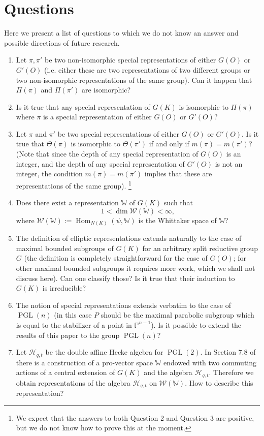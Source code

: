 \documentclass[11pt,a4paper,twoside]{amsart}
\theoremstyle{definition}
\theoremstyle{remark}
\newcommand{\mW}{\mathbb W}
\newcommand{\mcH}{\mathcal H}
\newcommand{\mcW}{\mathcal W}
\newcommand{\Hom}{\operatorname{Hom}}
\newcommand{\PGL}{\operatorname{PGL}}
\begin{document}
\section{Questions}\label{quest}
Here we present a list of questions to which we do not know an answer and possible directions of future research.
 \begin{enumerate}

\item
Let $\pi, \pi'$ be two non-isomorphic special representations of either $G(O)$ or $G'(O)$ (i.e. either these are two representations of two different groups or two non-isomorphic representations of the same group).
Can it happen that $\Pi(\pi)$ and $\Pi(\pi')$ are isomorphic? 

\item
Is it true that any special representation of $G(K)$ is isomorphic to $\Pi(\pi)$ where $\pi$ is a special representation of either $G(O)$ or $G'(O)$?
\item
Let $\pi$ and $\pi'$ be two special representations of either $G(O)$ or $G'(O)$. Is it true that $\Theta(\pi)$ is isomorphic to $\Theta(\pi')$ if and only if $m(\pi)=m(\pi')$? (Note that since the depth of any special representation of $G(O)$ is an integer, and the depth of any special representation of $G'(O)$ is not an integer, the condition $m(\pi)=m(\pi')$ implies that these are representations of the same group).
\footnote{We expect that the answers to both Question 2 and Question 3 are positive, but we do not know how to prove this at the moment.}
\item
Does there exist a representation $\mW$ of $G(K)$ such that
$$
1<\dim\mcW(\mW)<\infty,
$$
where $\mcW(\mW):=\Hom_{N(K)}(\psi,\mW)$ is the Whittaker space of $\mW$?

\item
The definition of elliptic representations  extends naturally
to the case of maximal bounded  subgroups of  $G(K)$ for an arbitrary split reductive group $G$ (the definition is completely straightforward for the case of $G(O)$; for other maximal bounded subgroups it requires more work, which we shall not discuss here). Can one classify those? Is it true that their induction to $G(K)$ is irreducible?

\item
The notion of  special representations  extends verbatim to the case of  $\PGL(n)$ (in this case $P$ should be the maximal parabolic subgroup which is equal to the stabilizer of a point in $\mathbb P^{n-1}$). Is it possible to extend the results of this paper to the group $\PGL(n)$?

\item
Let $\mcH _{q,t}$ be the double affine Hecke algebra for
$\PGL(2)$. In Section 7.8 of \cite{GK1} there is a
construction of a pro-vector space  $\mW$ endowed with two commuting actions of a central extension of $G(K)$ and the algebra $\mcH_{q,t}$. Therefore we obtain
representations of the algebra $ \mcH _{q,t} $ on
$\mcW (\mW)$. How to describe this  representation?
\end{enumerate}
\end{document}
